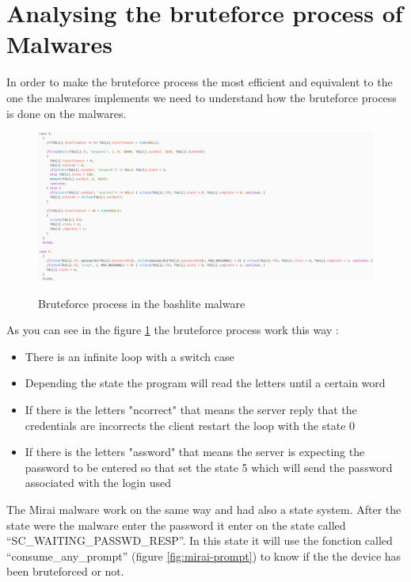 \documentclass{report}
\begin{document}
\section{Analysing the bruteforce process of Malwares}
In order to make the bruteforce process the most efficient and equivalent to the one the malwares implements we need to understand how the bruteforce process is done on the malwares.
\begin{figure}
 \caption{Bruteforce process in the bashlite malware}
 \includegraphics[width=1.2\textwidth]{./img/bashlite-bruteforce}
 \label{fig:bashlite-brute}
\end{figure}
As you can see in the figure \ref{fig:bashlite-brute} the bruteforce process work this way :
\begin{itemize}
\item There is an infinite loop with a switch case

\item Depending the state the program will read the letters until a certain word

\item If there is the letters "ncorrect" that means the server reply that the credentials are incorrects the client restart the loop with the state 0

\item If there is the letters "assword" that means the server is expecting the password to be entered so that set the state 5 which will send the password associated with the login used
\end{itemize}

The Mirai malware work on the same way and had also a state system. After the state were the malware enter the password it enter on the state called ``SC\_WAITING\_PASSWD\_RESP''. In this state it will use the fonction called ``consume\_any\_prompt'' (figure \ref{fig:mirai-prompt}) to know if the the device has been bruteforced or not.
\end{document}
